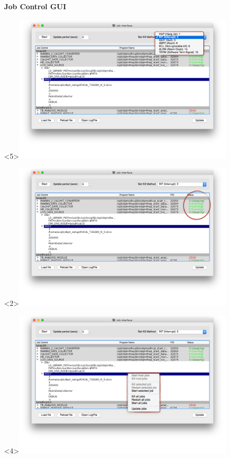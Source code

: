 \documentclass[8pt]{beamer}
\begin{document}
  \begin{frame}
    \frametitle{\secname}
    \framesubtitle{ Job Control GUI }

      \begin{overlayarea}{\textwidth}{\textheight}
      	\begin{center}
        		\begin{onlyenv}<5>\includegraphics[width=0.8\textwidth]{figs/JobInterface/JobInterface_KillSwitch.png}\end{onlyenv}
       		\begin{onlyenv}\includegraphics[width=0.8\textwidth]{figs/JobInterface/JobInterface_LiveStatus.png}\end{onlyenv}
        		\begin{onlyenv}<4>\includegraphics[width=0.8\textwidth]{figs/JobInterface/JobInterface_Module.png}\end{onlyenv}

\end{center}
\end{overlayarea}
\end{frame}
\end{document}
